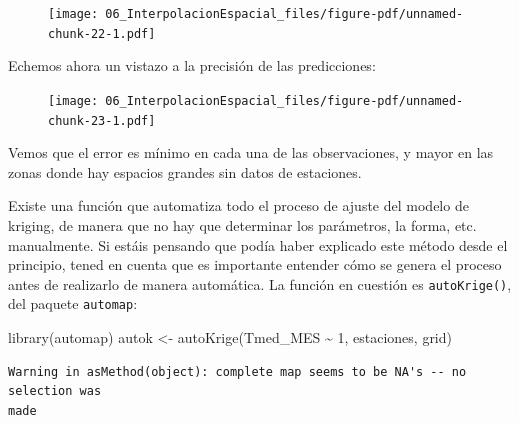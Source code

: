 \documentclass[
  letterpaper,
  DIV=11,
  numbers=noendperiod]{scrreprt}
\newenvironment{Shaded}{\begin{snugshade}}{\end{snugshade}}
\newcommand{\AttributeTok}[1]{\textcolor[rgb]{0.40,0.45,0.13}{#1}}
\newcommand{\DecValTok}[1]{\textcolor[rgb]{0.68,0.00,0.00}{#1}}
\newcommand{\FloatTok}[1]{\textcolor[rgb]{0.68,0.00,0.00}{#1}}
\newcommand{\FunctionTok}[1]{\textcolor[rgb]{0.28,0.35,0.67}{#1}}
\newcommand{\NormalTok}[1]{\textcolor[rgb]{0.00,0.23,0.31}{#1}}
\newcommand{\OtherTok}[1]{\textcolor[rgb]{0.00,0.23,0.31}{#1}}
\newcommand{\SpecialCharTok}[1]{\textcolor[rgb]{0.37,0.37,0.37}{#1}}
\newcommand{\StringTok}[1]{\textcolor[rgb]{0.13,0.47,0.30}{#1}}
\begin{document}
\begin{figure}[H]

{\centering \texttt{[image: 06\_InterpolacionEspacial\_files/figure-pdf/unnamed-chunk-22-1.pdf]}

}

\end{figure}

Echemos ahora un vistazo a la precisión de las predicciones:

\begin{Shaded}
\end{Shaded}

\begin{figure}[H]

{\centering \texttt{[image: 06\_InterpolacionEspacial\_files/figure-pdf/unnamed-chunk-23-1.pdf]}

}

\end{figure}

Vemos que el error es mínimo en cada una de las observaciones, y mayor
en las zonas donde hay espacios grandes sin datos de estaciones.

Existe una función que automatiza todo el proceso de ajuste del modelo
de kriging, de manera que no hay que determinar los parámetros, la
forma, etc. manualmente. Si estáis pensando que podía haber explicado
este método desde el principio, tened en cuenta que es importante
entender cómo se genera el proceso antes de realizarlo de manera
automática. La función en cuestión es \texttt{autoKrige()}, del paquete
\texttt{automap}:

\begin{Shaded}
\begin{Highlighting}[]
\FunctionTok{library}\NormalTok{(automap)}
\NormalTok{autok }\OtherTok{\textless{}{-}} \FunctionTok{autoKrige}\NormalTok{(Tmed\_MES }\SpecialCharTok{\textasciitilde{}} \DecValTok{1}\NormalTok{, estaciones,  grid)}
\end{Highlighting}
\end{Shaded}

\begin{verbatim}
Warning in asMethod(object): complete map seems to be NA's -- no selection was
made
\end{verbatim}
\end{document}
